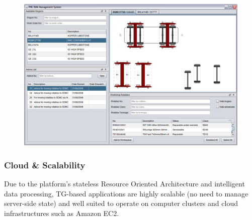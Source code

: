 \documentclass[a4paper,12pt,twocolumn,oneside,openright,final]{memoir}
\begin{document}
  \begin{figure}[!h]
  \centering
 \includegraphics[scale=0.18]{images/02-workspace-custom-layout.png}
  \end{figure}

\subsubsection*{Cloud \& Scalability}
  Due to the platform's stateless Resource Oriented Architecture and intelligent data processing, TG-based applications are highly scalable (no need to manage server-side state) and well suited to operate on computer clusters and cloud infrastructures such as Amazon EC2.
\end{document}
